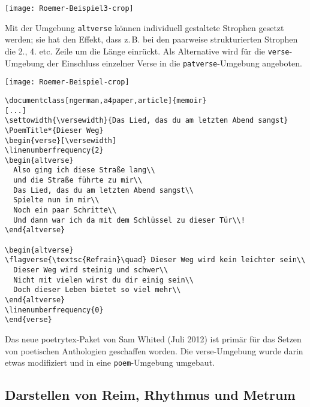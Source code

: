 \begin{center}
\texttt{[image: Roemer-Beispiel3-crop]}
\end{center}

Mit der Umgebung \texttt{altverse} können individuell gestaltete Strophen gesetzt werden; sie hat den Effekt, dass z.\,B. bei den paarweise 
strukturierten
Strophen die 2., 4. etc. Zeile um die Länge  einrückt.
Als Alternative wird für die \texttt{verse}-Umgebung der Einschluss einzelner
Verse in die \texttt{patverse}-Umgebung angeboten.

\begin{center}
\texttt{[image: Roemer-Beispiel-crop]}
\end{center}

\begin{lstlisting}
\documentclass[ngerman,a4paper,article]{memoir}
[...]
\settowidth{\versewidth}{Das Lied, das du am letzten Abend sangst}
\PoemTitle*{Dieser Weg}
\begin{verse}[\versewidth]
\linenumberfrequency{2}
\begin{altverse}
  Also ging ich diese Straße lang\\
  und die Straße führte zu mir\\
  Das Lied, das du am letzten Abend sangst\\
  Spielte nun in mir\\
  Noch ein paar Schritte\\
  Und dann war ich da mit dem Schlüssel zu dieser Tür\\!
\end{altverse}

\begin{altverse}
\flagverse{\textsc{Refrain}\quad} Dieser Weg wird kein leichter sein\\
  Dieser Weg wird steinig und schwer\\
  Nicht mit vielen wirst du dir einig sein\\
  Doch dieser Leben bietet so viel mehr\\
\end{altverse}
\linenumberfrequency{0}
\end{verse}
\end{lstlisting}

Das neue poetrytex-Paket von Sam Whited (Juli 2012) ist primär für das Setzen
von poetischen Anthologien geschaffen worden. Die verse-Umgebung wurde darin
etwas modifiziert und in eine \texttt{poem}-Umgebung umgebaut.


\subsection{Darstellen von Reim, Rhythmus und Metrum}

